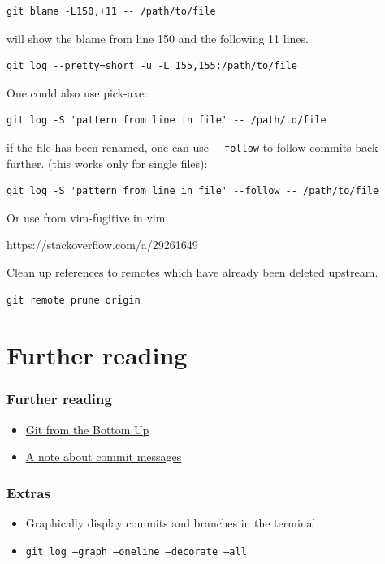 \documentclass{git_course}
\begin{document}
\begin{verbatim}
git blame -L150,+11 -- /path/to/file
\end{verbatim}

will show the blame from line 150 and the following 11 lines.

\begin{verbatim}
git log --pretty=short -u -L 155,155:/path/to/file
\end{verbatim}

One could also use pick-axe:

\begin{verbatim}
git log -S 'pattern from line in file' -- /path/to/file
\end{verbatim}

if the file has been renamed, one can use \verb|--follow| to follow
commits back further.  (this works only for single files):

\begin{verbatim}
git log -S 'pattern from line in file' --follow -- /path/to/file
\end{verbatim}

Or use  from vim-fugitive in vim:

https://stackoverflow.com/a/29261649


Clean up references to remotes which have already been deleted upstream.

\begin{verbatim}
git remote prune origin
\end{verbatim}


\section{Further reading}

\begin{frame}
\frametitle{Further reading}
\begin{itemize}
    \item \href{http://jwiegley.github.io/git-from-the-bottom-up/}{Git from the Bottom Up}
    \item \href{http://tbaggery.com/2008/04/19/a-note-about-git-commit-messages.html}
               {A note about commit messages}
\end{itemize}
\end{frame}

\begin{frame}
    \frametitle{Extras}
    \begin{itemize}
        \item Graphically display commits and branches in the terminal
        \item \texttt{git log --graph --oneline --decorate --all}
    \end{itemize}
\end{frame}
\end{document}
